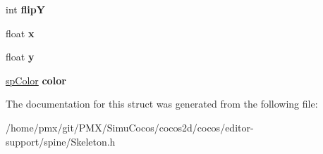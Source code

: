 \begin{DoxyCompactItemize}
$$int {\bfseries flipY}
\item 
\mbox{\label{structspSkeleton_a75f7c1167e8e66efe4ba5733c6e61fd7}} 
float {\bfseries x}
\item 
\mbox{\label{structspSkeleton_aefa785ffa9bc5ef33020e02a6b2e53dc}} 
float {\bfseries y}
\item 
\mbox{\label{structspSkeleton_a46cd366d37dd8da118de955c42e01ee8}} 
\hyperlink{structspColor}{sp\+Color} {\bfseries color}
\end{DoxyCompactItemize}


The documentation for this struct was generated from the following file\+:\begin{DoxyCompactItemize}
\item 
/home/pmx/git/\+P\+M\+X/\+Simu\+Cocos/cocos2d/cocos/editor-\/support/spine/Skeleton.\+h\end{DoxyCompactItemize}
